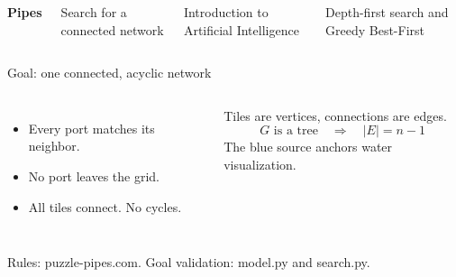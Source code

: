 \documentclass[aspectratio=169,11pt]{beamer}
\newcommand{\src}[1]{\vfill{\tiny\color{muted}#1}}
\newcommand{\tile}[4]{%
  \begin{scope}[shift={(#1,#2)}]
    \draw[gray!25] (-.5,-.5) rectangle (.5,.5);
    \foreach \bit/\dx/\dy in {1/0/0.5,2/0.5/0,4/0/-0.5,8/-0.5/0}{%
      \pgfmathtruncatemacro{\hasport}{mod(floor(#3/\bit),2)}
      \ifnum\hasport=1
        \draw[#4,line width=3.6pt,line cap=round] (0,0)--(\dx,\dy);
      \fi}
  \end{scope}}
\newcommand{\board}[2]{%
  \foreach \mask [count=\idx from 0] in {#1}{%
    \pgfmathtruncatemacro{\col}{mod(\idx,4)}
    \pgfmathtruncatemacro{\row}{-floor(\idx/4)}
    \tile{\col}{\row}{\mask}{#2}}
  \fill[white] (2,-2) circle (.15);
  \fill[blue] (2,-2) circle (.11);}
\begin{document}
\begin{frame}[plain]
\begin{columns}[c,onlytextwidth]
{\color{blue}\Huge\bfseries Pipes}\par\vspace{4mm}
{\Large Search for a connected network}\par\vspace{7mm}
Introduction to Artificial Intelligence\par\vspace{3mm}
\small Depth-first search and Greedy Best-First\par
{}
\centering
{}
\end{columns}
\end{frame}

\begin{frame}{Goal: one connected, acyclic network}
\begin{columns}[c,onlytextwidth]
\centering
{}
\begin{itemize}
\item Every port matches its neighbor.
\item No port leaves the grid.
\item All tiles connect. No cycles.
\end{itemize}
\vspace{4mm}
Tiles are vertices, connections are edges.
\[
G\text{ is a tree} \quad\Longrightarrow\quad |E|=n-1
\]
\small The blue source anchors water visualization.
\end{columns}
\src{Rules: puzzle-pipes.com. Goal validation: model.py and search.py.}
\end{frame}
\end{document}
